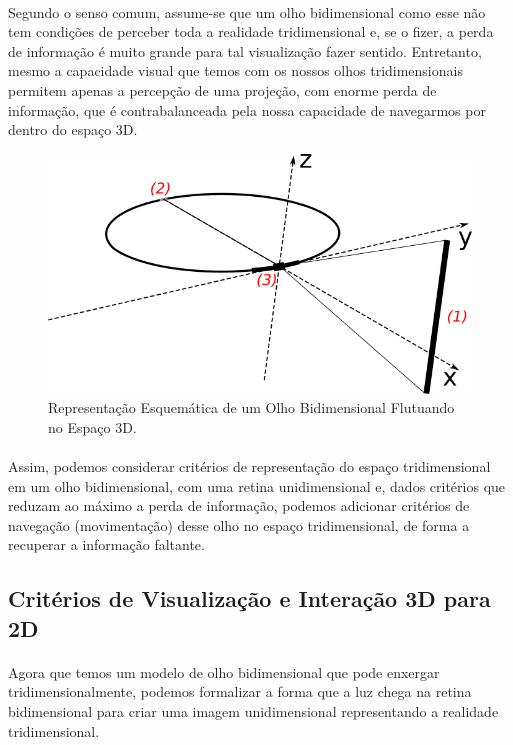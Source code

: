 \documentclass{article}
\begin{document}
	\paragraph{}
	Segundo o senso comum, assume-se que um olho bidimensional como esse não tem condições de perceber toda a realidade tridimensional e, se o fizer, a perda de informação é muito grande para tal visualização fazer sentido. Entretanto, mesmo a capacidade visual que temos com os nossos olhos tridimensionais permitem apenas a percepção de uma projeção, com enorme perda de informação, que é contrabalanceada pela nossa capacidade de navegarmos por dentro do espaço 3D.
	
	\begin{figure}[h]
		\centering
		\includegraphics[scale=0.7]{Olho-Bidimensional}
		\caption{Representação Esquemática de um Olho Bidimensional Flutuando no Espaço 3D.}
		\label{fig:Olho2D}
	\end{figure}
	
	\paragraph{}
	Assim, podemos considerar critérios de representação do espaço tridimensional em um olho bidimensional, com uma retina unidimensional e, dados critérios que reduzam ao máximo a perda de informação, podemos adicionar critérios de navegação (movimentação) desse olho no espaço tridimensional, de forma a recuperar a informação faltante.
	
	\subsection{Critérios de Visualização e Interação 3D para 2D} \label{criterios}
	
	\paragraph{}
	Agora que temos um modelo de olho bidimensional que pode enxergar tridimensionalmente, podemos formalizar a forma que a luz chega na retina bidimensional para criar uma imagem unidimensional representando a realidade tridimensional.
	
\end{document}
